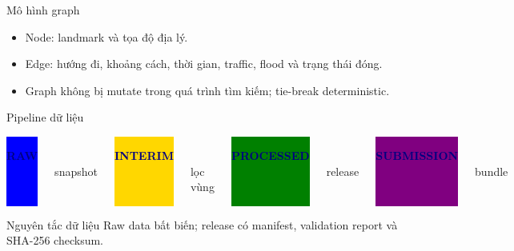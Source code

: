 \documentclass[aspectratio=169,11pt]{beamer}
\newcommand{\pill}[2]{\colorbox{#1}{\textcolor{navy}{\strut\textbf{#2}}}}
\begin{document}
\begin{frame}{Mô hình graph}
\begin{center}
\end{center}
\begin{itemize}
  \item Node: landmark và tọa độ địa lý.
  \item Edge: hướng đi, khoảng cách, thời gian, traffic, flood và trạng thái đóng.
  \item Graph không bị mutate trong quá trình tìm kiếm; tie-break deterministic.
\end{itemize}
\end{frame}

\begin{frame}{Pipeline dữ liệu}
\begin{columns}[c]
\centering\pill{blue}{RAW}\\ snapshot
\centering\pill{gold}{INTERIM}\\ lọc vùng
\centering\pill{green}{PROCESSED}\\ release
\centering\pill{purple}{SUBMISSION}\\ bundle
\end{columns}
\vfill
\begin{block}{Nguyên tắc dữ liệu}
Raw data bất biến; release có manifest, validation report và SHA-256 checksum.
\end{block}
\end{frame}
\end{document}
